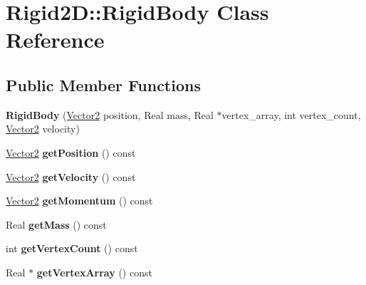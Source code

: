\hypertarget{class_rigid2_d_1_1_rigid_body}{
\section{Rigid2D::RigidBody Class Reference}
\label{class_rigid2_d_1_1_rigid_body}
}
\subsection*{Public Member Functions}
\begin{DoxyCompactItemize}
\item 
\hypertarget{class_rigid2_d_1_1_rigid_body_a428c179e3a042b8f77f196361c91852e}{
{\bfseries RigidBody} (\hyperlink{class_rigid2_d_1_1_vector2}{Vector2} position, Real mass, Real $\ast$vertex\_\-array, int vertex\_\-count, \hyperlink{class_rigid2_d_1_1_vector2}{Vector2} velocity)}
\label{class_rigid2_d_1_1_rigid_body_a428c179e3a042b8f77f196361c91852e}

\item 
\hypertarget{class_rigid2_d_1_1_rigid_body_a3c3aa6b7cddf1ed8e685be52ed03113d}{
\hyperlink{class_rigid2_d_1_1_vector2}{Vector2} {\bfseries getPosition} () const }
\label{class_rigid2_d_1_1_rigid_body_a3c3aa6b7cddf1ed8e685be52ed03113d}

\item 
\hypertarget{class_rigid2_d_1_1_rigid_body_a0b061241be1661516279f8bfe7e1c6b6}{
\hyperlink{class_rigid2_d_1_1_vector2}{Vector2} {\bfseries getVelocity} () const }
\label{class_rigid2_d_1_1_rigid_body_a0b061241be1661516279f8bfe7e1c6b6}

\item 
\hypertarget{class_rigid2_d_1_1_rigid_body_a42a3f4309e6711246f4b5e24f41badf2}{
\hyperlink{class_rigid2_d_1_1_vector2}{Vector2} {\bfseries getMomentum} () const }
\label{class_rigid2_d_1_1_rigid_body_a42a3f4309e6711246f4b5e24f41badf2}

\item 
\hypertarget{class_rigid2_d_1_1_rigid_body_ab3007e2109f5233eae241da5dd964236}{
Real {\bfseries getMass} () const }
\label{class_rigid2_d_1_1_rigid_body_ab3007e2109f5233eae241da5dd964236}

\item 
\hypertarget{class_rigid2_d_1_1_rigid_body_a780cc46e69c633df90a17f17e1dec615}{
int {\bfseries getVertexCount} () const }
\label{class_rigid2_d_1_1_rigid_body_a780cc46e69c633df90a17f17e1dec615}

\item 
\hypertarget{class_rigid2_d_1_1_rigid_body_a59a05c679e888be76aed9a349cf1e58f}{
Real $\ast$ {\bfseries getVertexArray} () const }
\label{class_rigid2_d_1_1_rigid_body_a59a05c679e888be76aed9a349cf1e58f}


\end{DoxyCompactItemize}
